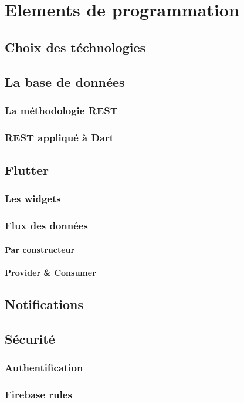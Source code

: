 
\chapter[Programmation]{Elements de programmation}

    \section{Choix des téchnologies}

    \section{La base de données}
        \subsection{La méthodologie REST}
        \subsection{REST appliqué à Dart}

    \section{Flutter}
        \subsection{Les widgets}
        \subsection{Flux des données}
            \subsubsection{Par constructeur}
            \subsubsection{Provider \& Consumer}
            
    \section{Notifications}
    
    \section{Sécurité}
        \subsection{Authentification}
        \subsection{Firebase rules}